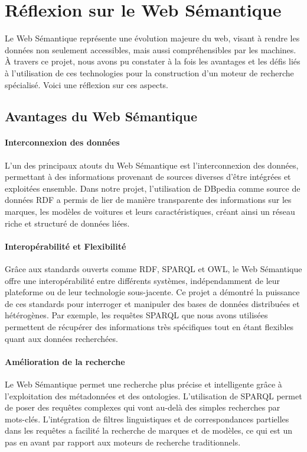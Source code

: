 \documentclass[a4paper]{article}
\begin{document}
\section{Réflexion sur le Web Sémantique}

Le Web Sémantique représente une évolution majeure du web, visant à rendre les données non seulement accessibles, mais aussi compréhensibles par les machines. À travers ce projet, nous avons pu constater à la fois les avantages et les défis liés à l'utilisation de ces technologies pour la construction d'un moteur de recherche spécialisé. Voici une réflexion sur ces aspects.

\subsection{Avantages du Web Sémantique}

\paragraph{Interconnexion des données} L'un des principaux atouts du Web Sémantique est l'interconnexion des données, permettant à des informations provenant de sources diverses d'être intégrées et exploitées ensemble. Dans notre projet, l'utilisation de DBpedia comme source de données RDF a permis de lier de manière transparente des informations sur les marques, les modèles de voitures et leurs caractéristiques, créant ainsi un réseau riche et structuré de données liées.

\paragraph{Interopérabilité et Flexibilité} Grâce aux standards ouverts comme RDF, SPARQL et OWL, le Web Sémantique offre une interopérabilité entre différents systèmes, indépendamment de leur plateforme ou de leur technologie sous-jacente. Ce projet a démontré la puissance de ces standards pour interroger et manipuler des bases de données distribuées et hétérogènes. Par exemple, les requêtes SPARQL que nous avons utilisées permettent de récupérer des informations très spécifiques tout en étant flexibles quant aux données recherchées.

\paragraph{Amélioration de la recherche} Le Web Sémantique permet une recherche plus précise et intelligente grâce à l'exploitation des métadonnées et des ontologies. L'utilisation de SPARQL permet de poser des requêtes complexes qui vont au-delà des simples recherches par mots-clés. L'intégration de filtres linguistiques et de correspondances partielles dans les requêtes a facilité la recherche de marques et de modèles, ce qui est un pas en avant par rapport aux moteurs de recherche traditionnels.
\end{document}

